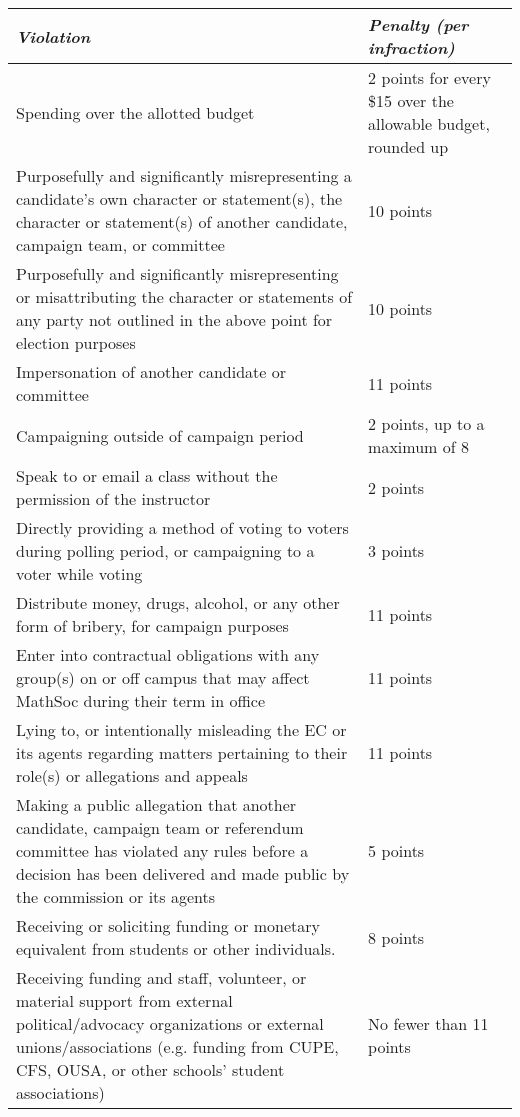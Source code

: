 \begin{center}
	\begin{tabular}{| p{12cm} | p{3.5cm} |}
		\hline
		\rowcolor{lightgray} \textit{\textbf{Violation}} & \textit{\textbf{Penalty (per infraction)}}  \\ 
		\hline
		Spending over the allotted budget & 2 points for every \$15 over the allowable budget, rounded up\\  
		\hline
		Purposefully and significantly misrepresenting a candidate’s own character or statement(s), the character or statement(s) of another candidate, campaign team, or committee & 10 points \\
		\hline
		Purposefully and significantly misrepresenting or misattributing the character or statements of any party not outlined in the above point for election purposes & 10 points \\
		\hline 
		Impersonation of another candidate or committee & 11 points \\
		\hline
		Campaigning outside of campaign period & 2 points, up to a maximum of 8 \\
		\hline
		Speak to or email a class without the permission of the instructor & 2 points \\
		\hline
		Directly providing a method of voting to voters during polling period, or campaigning to a voter while voting & 3 points \\
		\hline
		Distribute money, drugs, alcohol, or any other form of bribery, for campaign purposes & 11 points \\
		\hline 
		Enter into contractual obligations with any group(s) on or off campus that may affect MathSoc during their term in office & 11 points \\ 
		\hline 
		Lying to, or intentionally misleading the EC or its agents regarding matters pertaining to their role(s) or allegations and appeals & 11 points \\
		\hline
		Making a public allegation that another candidate, campaign team or referendum committee has violated any rules before a decision has been delivered and made public by the commission or its agents & 5 points \\
		\hline
		Receiving or soliciting funding or monetary equivalent from students or other individuals. & 8 points \\
		\hline 
		Receiving funding and staff, volunteer, or material support from external political/advocacy organizations or external unions/associations (e.g. funding from CUPE, CFS, OUSA, or other schools’ student associations) & No fewer than 11 points \\

\end{tabular}
\end{center}
